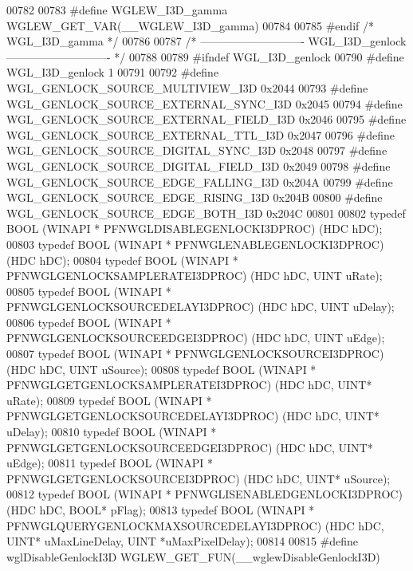 \begin{DoxyCode}
00782 
00783 \textcolor{preprocessor}{#define WGLEW\_I3D\_gamma WGLEW\_GET\_VAR(\_\_WGLEW\_I3D\_gamma)}
00784 
00785 \textcolor{preprocessor}{#endif }\textcolor{comment}{/* WGL\_I3D\_gamma */}\textcolor{preprocessor}{}
00786 
00787 \textcolor{comment}{/* ---------------------------- WGL\_I3D\_genlock ---------------------------- */}
00788 
00789 \textcolor{preprocessor}{#ifndef WGL\_I3D\_genlock}
00790 \textcolor{preprocessor}{#define WGL\_I3D\_genlock 1}
00791 
00792 \textcolor{preprocessor}{#define WGL\_GENLOCK\_SOURCE\_MULTIVIEW\_I3D 0x2044}
00793 \textcolor{preprocessor}{#define WGL\_GENLOCK\_SOURCE\_EXTERNAL\_SYNC\_I3D 0x2045}
00794 \textcolor{preprocessor}{#define WGL\_GENLOCK\_SOURCE\_EXTERNAL\_FIELD\_I3D 0x2046}
00795 \textcolor{preprocessor}{#define WGL\_GENLOCK\_SOURCE\_EXTERNAL\_TTL\_I3D 0x2047}
00796 \textcolor{preprocessor}{#define WGL\_GENLOCK\_SOURCE\_DIGITAL\_SYNC\_I3D 0x2048}
00797 \textcolor{preprocessor}{#define WGL\_GENLOCK\_SOURCE\_DIGITAL\_FIELD\_I3D 0x2049}
00798 \textcolor{preprocessor}{#define WGL\_GENLOCK\_SOURCE\_EDGE\_FALLING\_I3D 0x204A}
00799 \textcolor{preprocessor}{#define WGL\_GENLOCK\_SOURCE\_EDGE\_RISING\_I3D 0x204B}
00800 \textcolor{preprocessor}{#define WGL\_GENLOCK\_SOURCE\_EDGE\_BOTH\_I3D 0x204C}
00801 
00802 \textcolor{keyword}{typedef} BOOL (WINAPI * PFNWGLDISABLEGENLOCKI3DPROC) (HDC hDC);
00803 \textcolor{keyword}{typedef} BOOL (WINAPI * PFNWGLENABLEGENLOCKI3DPROC) (HDC hDC);
00804 \textcolor{keyword}{typedef} BOOL (WINAPI * PFNWGLGENLOCKSAMPLERATEI3DPROC) (HDC hDC, UINT uRate);
00805 \textcolor{keyword}{typedef} BOOL (WINAPI * PFNWGLGENLOCKSOURCEDELAYI3DPROC) (HDC hDC, UINT uDelay);
00806 \textcolor{keyword}{typedef} BOOL (WINAPI * PFNWGLGENLOCKSOURCEEDGEI3DPROC) (HDC hDC, UINT uEdge);
00807 \textcolor{keyword}{typedef} BOOL (WINAPI * PFNWGLGENLOCKSOURCEI3DPROC) (HDC hDC, UINT uSource);
00808 \textcolor{keyword}{typedef} BOOL (WINAPI * PFNWGLGETGENLOCKSAMPLERATEI3DPROC) (HDC hDC, UINT* uRate);
00809 \textcolor{keyword}{typedef} BOOL (WINAPI * PFNWGLGETGENLOCKSOURCEDELAYI3DPROC) (HDC hDC, UINT* 
      uDelay);
00810 \textcolor{keyword}{typedef} BOOL (WINAPI * PFNWGLGETGENLOCKSOURCEEDGEI3DPROC) (HDC hDC, UINT* uEdge);
00811 \textcolor{keyword}{typedef} BOOL (WINAPI * PFNWGLGETGENLOCKSOURCEI3DPROC) (HDC hDC, UINT* uSource);
00812 \textcolor{keyword}{typedef} BOOL (WINAPI * PFNWGLISENABLEDGENLOCKI3DPROC) (HDC hDC, BOOL* pFlag);
00813 \textcolor{keyword}{typedef} BOOL (WINAPI * PFNWGLQUERYGENLOCKMAXSOURCEDELAYI3DPROC) (HDC hDC, UINT* 
      uMaxLineDelay, UINT *uMaxPixelDelay);
00814 
00815 \textcolor{preprocessor}{#define wglDisableGenlockI3D WGLEW\_GET\_FUN(\_\_wglewDisableGenlockI3D)}

\end{DoxyCode}
